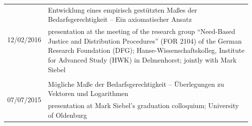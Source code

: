 \documentclass[a4paper,10pt]{article}
\begin{document}
\begin{longtable}{p{2.5cm}p{11cm}}
\\
\multirow{2}{2.5cm}{\footnotesize{12/02/2016}} & Entwicklung eines empirisch gestützten Maßes der Bedarfsgerechtigkeit -- Ein axiomatischer Ansatz\\
& \footnotesize{presentation at the meeting of the research group \enquote{Need-Based Justice and Distribution Procedures} (FOR 2104) of the German Research Foundation (DFG); Hanse-Wissenschaftskolleg, Institute for Advanced Study (HWK) in Delmenhorst; jointly with Mark Siebel}\\
\\
\multirow{2}{2.5cm}{\footnotesize{07/07/2015}} & Mögliche Maße der Bedarfsgerechtigkeit -- Überlegungen zu Vektoren und Logarithmen\\
& \footnotesize{presentation at Mark Siebel's graduation colloquium; University of Oldenburg}\\
\end{longtable}


\clearpage
\end{document}
